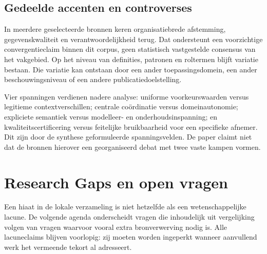 \subsection{Gedeelde accenten en controverses}
In meerdere geselecteerde bronnen keren organisatiebrede afstemming, gegevenskwaliteit en verantwoordelijkheid terug. Dat ondersteunt een voorzichtige convergentieclaim binnen dit corpus, geen statistisch vastgestelde consensus van het vakgebied. Op het niveau van definities, patronen en roltermen blijft variatie bestaan. Die variatie kan ontstaan door een ander toepassingsdomein, een ander beschouwingsniveau of een andere publicatiedoelstelling. \parencite{L05,L07,L20,P01}

Vier spanningen verdienen nadere analyse: uniforme voorkeurswaarden versus legitieme contextverschillen; centrale coördinatie versus domeinautonomie; expliciete semantiek versus modelleer- en onderhoudsinspanning; en kwaliteitscertificering versus feitelijke bruikbaarheid voor een specifieke afnemer. Dit zijn door de synthese geformuleerde spanningsvelden. De paper claimt niet dat de bronnen hierover een georganiseerd debat met twee vaste kampen vormen. \parencite{L19,L20,L23,L13}

\section{Research Gaps en open vragen}
Een hiaat in de lokale verzameling is niet hetzelfde als een wetenschappelijke lacune. De volgende agenda onderscheidt vragen die inhoudelijk uit vergelijking volgen van vragen waarvoor vooral extra bronverwerving nodig is. Alle lacuneclaims blijven voorlopig: zij moeten worden ingeperkt wanneer aanvullend werk het vermeende tekort al adresseert.

